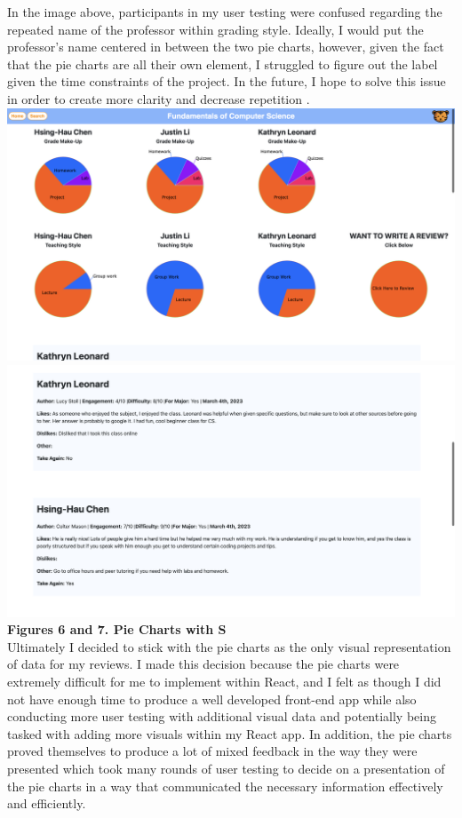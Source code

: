 \documentclass[10pt,twocolumn]{article}
\begin{document}
In the image above, participants in my user testing were confused regarding the repeated name of the professor within grading style. Ideally, I would put the professor's name centered in between the two pie charts, however, given the fact that the pie charts are all their own element, I struggled to figure out the label given the time constraints of the project. In the future, I hope to solve this issue in order to create more clarity and decrease repetition \cite{noname08}. \\



\includegraphics[scale=.15]{UT6}\\
\includegraphics[scale=.175]{UT7}\\ \textbf{\footnotesize{Figures 6 and 7. Pie Charts with S}}\\

Ultimately I decided to stick with the pie charts as the only visual representation of data for my reviews. I made this decision because the pie charts were extremely difficult for me to implement within React, and I felt as though I did not have enough time to produce a well developed front-end app while also conducting more user testing with additional visual data and potentially being tasked with adding more visuals within my React app. In addition, the pie charts proved themselves to produce a lot of mixed feedback in the way they were presented which took many rounds of user testing to decide on a presentation of the pie charts in a way that communicated the necessary information effectively and efficiently. 
\end{document}
